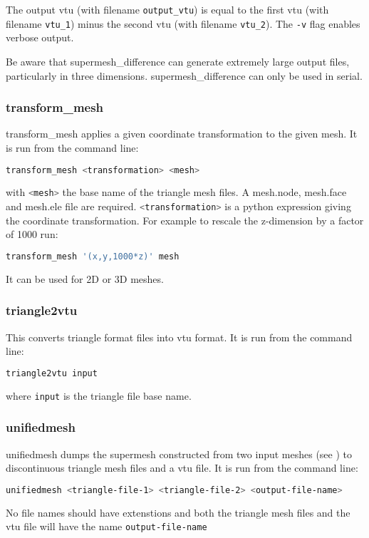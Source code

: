 The output vtu (with filename \lstinline[language = Bash]+output_vtu+)
is equal to the first vtu (with filename \lstinline[language = Bash]+vtu_1+)
minus the second vtu (with filename \lstinline[language = Bash]+vtu_2+).  The
\lstinline[language = Bash]+-v+ flag enables verbose output.

Be aware that supermesh\_difference can generate extremely large output files,
particularly in three dimensions. supermesh\_difference can only be used in
serial.


\subsubsection{transform\_mesh}
\label{sect:transform_mesh}

transform\_mesh applies a given coordinate transformation to the given mesh. It is run from the command line:
\begin{lstlisting}[language = Bash]
transform_mesh <transformation> <mesh>
\end{lstlisting}
with \lstinline[language = Bash]+<mesh>+ the base name of the triangle mesh files. A mesh.node, mesh.face and mesh.ele file are required. \lstinline[language = Bash]+<transformation>+ is a python expression giving the coordinate transformation. For example to rescale the z-dimension by a factor of 1000 run:
\begin{lstlisting}[language = Bash]
transform_mesh '(x,y,1000*z)' mesh
\end{lstlisting}
It can be used for 2D or 3D meshes.


\subsubsection{triangle2vtu}
\label{sect:triangle2vtu}
This converts triangle format files into vtu format. It is run from the command line:

\begin{lstlisting}[language = Bash]
triangle2vtu input
\end{lstlisting}

where \lstinline+input+ is the triangle file base name.


\subsubsection{unifiedmesh}
\label{sect:unifiedmesh}
unifiedmesh dumps the supermesh constructed from two input meshes (see \citet{farrell2009a,farrell2010a}) to discontinuous triangle mesh files and a vtu file. It is run from the command line:
\begin{lstlisting}[language = Bash]
unifiedmesh <triangle-file-1> <triangle-file-2> <output-file-name>
\end{lstlisting} 
No file names should have extenstions and both the triangle mesh files and the vtu file will have the name \lstinline[language = Bash]+output-file-name+

